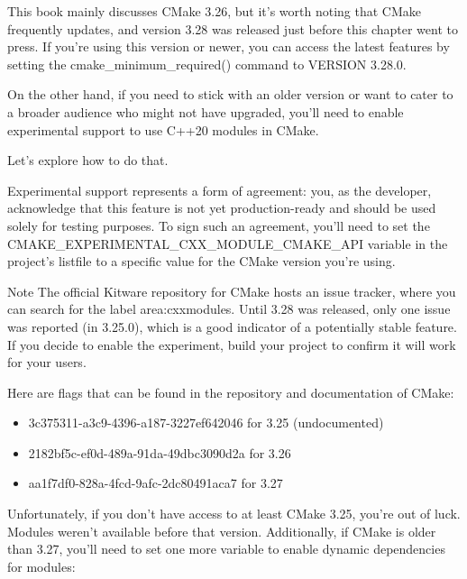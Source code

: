 
This book mainly discusses CMake 3.26, but it’s worth noting that CMake frequently updates, and version 3.28 was released just before this chapter went to press. If you’re using this version or newer, you can access the latest features by setting the cmake\_minimum\_required() command to VERSION 3.28.0.

On the other hand, if you need to stick with an older version or want to cater to a broader audience who might not have upgraded, you’ll need to enable experimental support to use C++20 modules in CMake.

Let’s explore how to do that.


Experimental support represents a form of agreement: you, as the developer, acknowledge that this feature is not yet production-ready and should be used solely for testing purposes. To sign such an agreement, you’ll need to set the CMAKE\_EXPERIMENTAL\_CXX\_MODULE\_CMAKE\_API variable in the project’s listfile to a specific value for the CMake version you’re using.

\begin{myNotic}{Note}
The official Kitware repository for CMake hosts an issue tracker, where you can search for the label area:cxxmodules. Until 3.28 was released, only one issue was reported (in 3.25.0), which is a good indicator of a potentially stable feature. If you decide to enable the experiment, build your project to confirm it will work for your users.
\end{myNotic}

Here are flags that can be found in the repository and documentation of CMake:

\begin{itemize}
\item
3c375311-a3c9-4396-a187-3227ef642046 for 3.25 (undocumented)

\item
2182bf5c-ef0d-489a-91da-49dbc3090d2a for 3.26

\item
aa1f7df0-828a-4fcd-9afc-2dc80491aca7 for 3.27
\end{itemize}

Unfortunately, if you don’t have access to at least CMake 3.25, you’re out of luck. Modules weren’t available before that version. Additionally, if CMake is older than 3.27, you’ll need to set one more variable to enable dynamic dependencies for modules:

